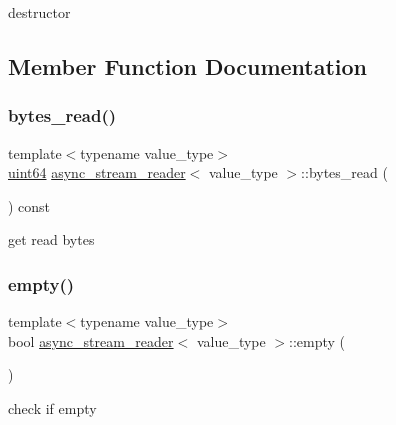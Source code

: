 destructor 



\subsection{Member Function Documentation}
\mbox{\label{classasync__stream__reader_a15f6c24ea5065855b1d5df69cc7e3e1a}} 
\subsubsection{\texorpdfstring{bytes\+\_\+read()}{bytes\_read()}}
{\footnotesize\ttfamily template$<$typename value\+\_\+type$>$ \\
\hyperlink{types_8h_a60e8696a4678cd348e991a1f172e53f7}{uint64} \hyperlink{classasync__stream__reader}{async\+\_\+stream\+\_\+reader}$<$ value\+\_\+type $>$\+::bytes\+\_\+read (\begin{DoxyParamCaption}{ }\end{DoxyParamCaption}) const\hspace{0.3cm}{\ttfamily [inline]}}



get read bytes 

\mbox{\label{classasync__stream__reader_accade2559119f3bed538d20f6eec4cfb}} 
\subsubsection{\texorpdfstring{empty()}{empty()}}
{\footnotesize\ttfamily template$<$typename value\+\_\+type$>$ \\
bool \hyperlink{classasync__stream__reader}{async\+\_\+stream\+\_\+reader}$<$ value\+\_\+type $>$\+::empty (\begin{DoxyParamCaption}{ }\end{DoxyParamCaption})\hspace{0.3cm}{\ttfamily [inline]}}



check if empty 

